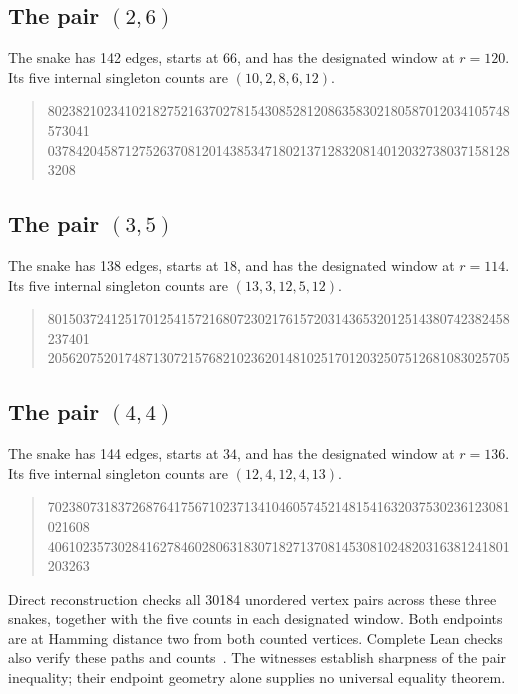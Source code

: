 \documentclass[11pt,a4paper]{article}
\theoremstyle{definition}
\theoremstyle{remark}
\begin{document}
\subsection{The pair $(2,6)$}

The snake has 142 edges, starts at $66$, and has the designated window at $r=120$. Its five internal singleton counts are $(10,2,8,6,12)$.

\begin{quote}\ttfamily\small

802382102341021827521637027815430852812086358302180587012034105748573041\\
0378420458712752637081201438534718021371283208140120327380371581283208

\end{quote}

\subsection{The pair $(3,5)$}

The snake has 138 edges, starts at $18$, and has the designated window at $r=114$. Its five internal singleton counts are $(13,3,12,5,12)$.

\begin{quote}\ttfamily\small

801503724125170125415721680723021761572031436532012514380742382458237401\\
205620752017487130721576821023620148102517012032507512681083025705

\end{quote}

\subsection{The pair $(4,4)$}

The snake has 144 edges, starts at $34$, and has the designated window at $r=136$. Its five internal singleton counts are $(12,4,12,4,13)$.

\begin{quote}\ttfamily\small

702380731837268764175671023713410460574521481541632037530236123081021608\\
406102357302841627846028063183071827137081453081024820316381241801203263

\end{quote}

Direct reconstruction checks all 30184 unordered vertex pairs across these three snakes, together with the five counts in each designated window. Both endpoints are at Hamming distance two from both counted vertices. Complete Lean checks also verify these paths and counts~\cite{pair012032archive}. The witnesses establish sharpness of the pair inequality; their endpoint geometry alone supplies no universal equality theorem.
\end{document}
